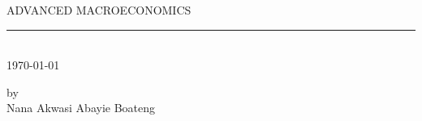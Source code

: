 \documentclass[12pt]{article}
\numberwithin{equation}{subsection} %
\renewcommand{\baselinestretch}{2}
\begin{document}
\pagestyle{empty}



\newpage
\begin{center}
\thispagestyle{empty} %
  {ADVANCED MACROECONOMICS\\ [.07in]} \rm
\rule{1.25in}{.01in}\\[.0 in]
\today
\vspace{.6in}



\vspace{.6in}

\vspace{.6in}

by  \\ [.06in]
{Nana  Akwasi Abayie Boateng} \\[.06in]
\end{center}
\author{Nana Akwasi Abayie Boateng\footnotemark[1]}












\def\R{\mathbb{R}}
\def\N{\mathbb{N}}
\def\Z{\mathbb{Z}}
\def\Q{\mathbb{Q}}
\def\la{\langle}
\def\ra{\rangle}

\def\dist{{\rm dist}}
\def\X{{\bf X}}
\def\C{{\bf C}}
\def\D{{\bf D}}
\def\I{{\bf I}}
\def\J{{\bf J}}
\def\x{{\bf x}}
\def\y{{\bf y}}
\def\z{{\bf z}}
\def\W{{\bf W}}
\def\g{{\bf g}}
\def\e{{\bf e}}
\def\b{{\bf b}}
\def\u{{\bf u}}
\def\Beta{{\bf \beta}}
\def\pen{{\rm pen}}
\def\argmin{{\rm argmin}}
\def\diag{{\rm diag}}
\def\sgn{{\rm sgn}}
\def\supp{{\rm\rm supp}}


\vspace*{1cm}
\newcommand{\Appendixpage}{
    \setcounter{section}{0}
    \renewcommand{\baselinestretch}{1}\small\normalsize
    \thispagestyle{myheadings}
    \addcontentsline{toc}{section}{APPENDICES\dotfill}
    \mbox{}
    \vfil
    \begin{center}%
    APPENDICES
    \vfil
    \end{center}%
    \renewcommand{\baselinestretch}{1.66} \small\normalsize%
    \cleardoublepage
  }
\end{document}
